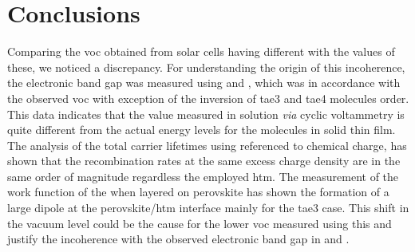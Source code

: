 \section{Conclusions}
	Comparing the \gls{voc} obtained from solar cells having different  with the  values of these, we noticed a discrepancy.
	For understanding the origin of this incoherence, the electronic band gap was measured using  and , which was in accordance with the observed \gls{voc} with exception of the inversion of \gls{tae3} and \gls{tae4} molecules order.
	This data indicates that the  value measured in solution \textsl{via} cyclic voltammetry is quite different from the actual energy levels for the molecules in solid thin film.
	The analysis of the total carrier lifetimes using  referenced to chemical charge, has shown that the recombination rates at the same excess charge density are in the same order of magnitude regardless the employed \gls{htm}.
	The measurement of the work function of the  when layered on perovskite has shown the formation of a large dipole at the perovskite\-/\gls{htm} interface mainly for the \gls{tae3} case.
	This shift in the vacuum level could be the cause for the lower \gls{voc} measured using this  and justify the incoherence with the observed electronic band gap in  and .
